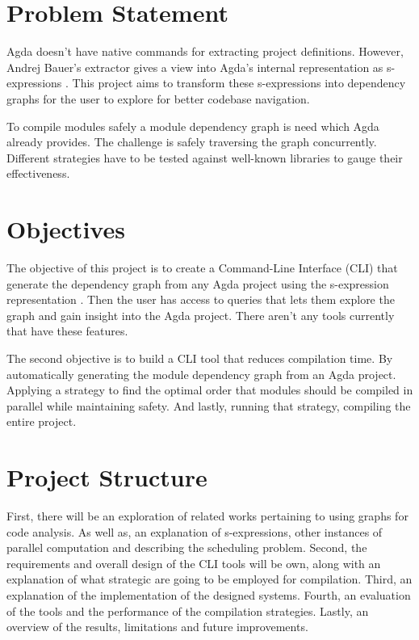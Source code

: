 \section{Problem Statement}

Agda doesn't have native commands for extracting project definitions. However,
Andrej Bauer's extractor gives a view into Agda's internal representation as
s-expressions \cite{andrej}. This project aims to transform these s-expressions
into dependency graphs for the user to explore for better codebase navigation.

To compile modules safely a module dependency graph is need which Agda already
provides. The challenge is safely traversing the graph concurrently. Different
strategies have to be tested against well-known libraries to gauge their
effectiveness. 

\section{Objectives}

The objective of this project is to create a Command-Line Interface (CLI) that
generate the dependency graph from any Agda project using the s-expression
representation \cite{andrej}. Then the user has access to queries that lets
them explore the graph and gain insight into the Agda project. There aren't any
tools currently that have these features. 

The second objective is to build a CLI tool that reduces compilation time. By
automatically generating the module dependency graph from an Agda project.
Applying a strategy to find the optimal order that modules should be compiled
in parallel while maintaining safety. And lastly, running that strategy,
compiling the entire project.

\section{Project Structure}

First, there will be an exploration of related works pertaining to using graphs
for code analysis. As well as, an explanation of s-expressions, other instances
of parallel computation and describing the scheduling problem. Second, the
requirements and overall design of the CLI tools will be own, along with an
explanation of what strategic are going to be employed for compilation. Third,
an explanation of the implementation of the designed systems. Fourth, an
evaluation of the tools and the performance of the compilation strategies.
Lastly, an overview of the results, limitations and future improvements.
